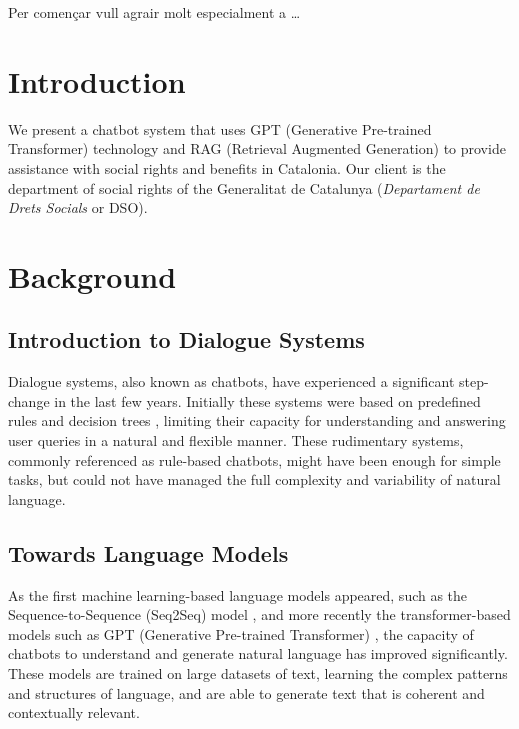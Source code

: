 \documentclass[a4paper,12pt,twoside]{ThesisStyle}
\begin{document}
Per començar vull agrair molt especialment a \ldots


\tableofcontents

\listoffigures

\listoftables

\mainmatter

\chapter{Introduction}
\label{cap:intro}

We present a chatbot system that uses GPT (Generative Pre-trained Transformer) technology and RAG (Retrieval Augmented Generation) to provide assistance with social rights and benefits in Catalonia. Our client is the department of social rights of the Generalitat de Catalunya (\textit{Departament de Drets Socials} or DSO).

\chapter{Background}
\label{cap:background}

\section{Introduction to Dialogue Systems}
\label{sec:chat}

Dialogue systems, also known as chatbots, have experienced a significant step-change in the last few years. Initially these systems were based on predefined rules and decision trees \cite{Weizenbaum1966ELIZA, AbuShawar2015ALICE}, limiting their capacity for understanding and answering user queries in a natural and flexible manner. These rudimentary systems, commonly referenced as rule-based chatbots, might have been enough for simple tasks, but could not have managed the full complexity and variability of natural language.

\section{Towards Language Models}
\label{sec:language}

As the first machine learning-based language models appeared, such as the Sequence-to-Sequence (Seq2Seq) model \cite{Sutskever2014SequenceSequenceLearningNeural}, and more recently the transformer-based models such as GPT (Generative Pre-trained Transformer) \cite{Vaswani2023AttentionNeed, Radford2018ImprovingLU}, the capacity of chatbots to understand and generate natural language has improved significantly. These models are trained on large datasets of text, learning the complex patterns and structures of language, and are able to generate text that is coherent and contextually relevant.
\end{document}

